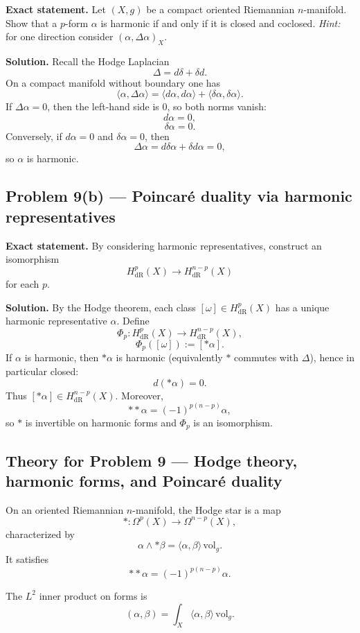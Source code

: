 \documentclass[12pt,a4paper]{article}
\theoremstyle{plain}
\theoremstyle{definition}      %
\begin{document}
\textbf{Exact statement.}
Let $(X,g)$ be a compact oriented Riemannian $n$-manifold.
Show that a $p$-form $\alpha$ is harmonic if and only if it is closed and coclosed.
\textit{Hint:} for one direction consider $(\alpha,\Delta\alpha)_X$.

\textbf{Solution.}
Recall the Hodge Laplacian
\[
\Delta=d\delta+\delta d.
\]
On a compact manifold without boundary one has
\[
\langle \alpha,\Delta\alpha\rangle
=
\langle d\alpha,d\alpha\rangle
+
\langle \delta\alpha,\delta\alpha\rangle.
\]
If $\Delta\alpha=0$, then the left-hand side is $0$, so both norms vanish:
\[
d\alpha=0,
\]
\[
\delta\alpha=0.
\]
Conversely, if $d\alpha=0$ and $\delta\alpha=0$, then
\[
\Delta\alpha=d\delta\alpha+\delta d\alpha=0,
\]
so $\alpha$ is harmonic.

\subsection*{Problem 9(b) — Poincar\'e duality via harmonic representatives}

\textbf{Exact statement.}
By considering harmonic representatives, construct an isomorphism
\[
H^p_{\mathrm{dR}}(X)\to H^{n-p}_{\mathrm{dR}}(X)
\]
for each $p$.

\textbf{Solution.}
By the Hodge theorem, each class $[\omega]\in H^p_{\mathrm{dR}}(X)$ has a unique harmonic representative $\alpha$.
Define
\[
\Phi_p:H^p_{\mathrm{dR}}(X)\to H^{n-p}_{\mathrm{dR}}(X),
\]
\[
\Phi_p([\omega]):=[*\alpha].
\]
If $\alpha$ is harmonic, then $*\alpha$ is harmonic (equivalently $*$ commutes with $\Delta$), hence in particular closed:
\[
d(*\alpha)=0.
\]
Thus $[*\alpha]\in H^{n-p}_{\mathrm{dR}}(X)$.
Moreover,
\[
**\alpha=(-1)^{p(n-p)}\alpha,
\]
so $*$ is invertible on harmonic forms and $\Phi_p$ is an isomorphism.





\subsection*{Theory for Problem 9 — Hodge theory, harmonic forms, and Poincar\'e duality}

On an oriented Riemannian $n$-manifold, the Hodge star is a map
\[
*:\Omega^p(X)\to\Omega^{n-p}(X),
\]
characterized by
\[
\alpha\wedge *\beta=\langle \alpha,\beta\rangle\,\mathrm{vol}_g.
\]
It satisfies
\[
**\alpha=(-1)^{p(n-p)}\alpha.
\]

The $L^2$ inner product on forms is
\[
(\alpha,\beta)=\int_X \langle \alpha,\beta\rangle\,\mathrm{vol}_g.
\]
\end{document}
